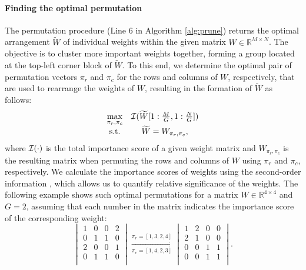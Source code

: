 \paragraph{Finding the optimal permutation}
The permutation procedure (Line 6 in Algorithm \ref{alg:prune}) returns the optimal arrangement $\widetilde{W}$ of individual weights within the given matrix $W \in \mathbb{R}^{M\times N}$. The objective is to cluster more important weights together, forming a group located at the top-left corner block of $\widetilde{W}$. To this end, we determine the optimal pair of permutation vectors $\pi_r$ and $\pi_c$ for the rows and columns of $W$, respectively, that are used to rearrange the weights of $W$, resulting in the formation of $\widetilde{W}$ as follows:
\begin{equation}\label{eq:wtilde}
\begin{matrix}
\max\limits_{\pi_{r},\pi_{c}}& \mathcal{I}(\widetilde{W}[1:\frac{M}{G}, 1:\frac{N}{G}]) \\
\text{s.t.} & \widetilde{W} = W_{\pi_r, \pi_c},
\end{matrix}
\end{equation}
where $\mathcal{I}(\cdot)$ is the total importance score of a given weight matrix and $W_{\pi_r, \pi_c}$ is the resulting matrix when permuting the rows and columns of $W$ using $\pi_r$ and $\pi_c$, respectively. We calculate the importance scores of weights using the second-order information \cite{Brain,second-order, WoodFisher}, which allows us to quantify relative significance of the weights. The following example shows such optimal permutations for a matrix $W \in \mathbb{R}^{4\times 4}$ and $G=2$, assuming that each number in the matrix indicates the importance score of the corresponding weight:
$$
    \begin{vmatrix}
   1 & 0 & 0 & 2 \\
   0 & 1 & 1 & 0 \\     
    2 & 0 & 0 & 1  \\
    0 & 1 & 1 & 0  \\
    \end{vmatrix}  \xrightarrow[\pi_{c}={[1,4,2,3]}]{\pi_{r}=[1,3,2,4]} 
    \begin{vmatrix}
   1 & 2 & 0 & 0 \\
   2 & 1 & 0 & 0 \\     
    0 & 0 & 1 & 1  \\
    0 & 0 & 1 & 1  \\
    \end{vmatrix}.
$$

